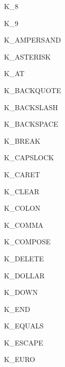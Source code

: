 \begin{datadesc}{K_8}
\end{datadesc}
\begin{datadesc}{K_9}
\end{datadesc}
\begin{datadesc}{K_AMPERSAND}
\end{datadesc}
\begin{datadesc}{K_ASTERISK}
\end{datadesc}
\begin{datadesc}{K_AT}
\end{datadesc}
\begin{datadesc}{K_BACKQUOTE}
\end{datadesc}
\begin{datadesc}{K_BACKSLASH}
\end{datadesc}
\begin{datadesc}{K_BACKSPACE}
\end{datadesc}
\begin{datadesc}{K_BREAK}
\end{datadesc}
\begin{datadesc}{K_CAPSLOCK}
\end{datadesc}
\begin{datadesc}{K_CARET}
\end{datadesc}
\begin{datadesc}{K_CLEAR}
\end{datadesc}
\begin{datadesc}{K_COLON}
\end{datadesc}
\begin{datadesc}{K_COMMA}
\end{datadesc}
\begin{datadesc}{K_COMPOSE}
\end{datadesc}
\begin{datadesc}{K_DELETE}
\end{datadesc}
\begin{datadesc}{K_DOLLAR}
\end{datadesc}
\begin{datadesc}{K_DOWN}
\end{datadesc}
\begin{datadesc}{K_END}
\end{datadesc}
\begin{datadesc}{K_EQUALS}
\end{datadesc}
\begin{datadesc}{K_ESCAPE}
\end{datadesc}
\begin{datadesc}{K_EURO}
\end{datadesc}
